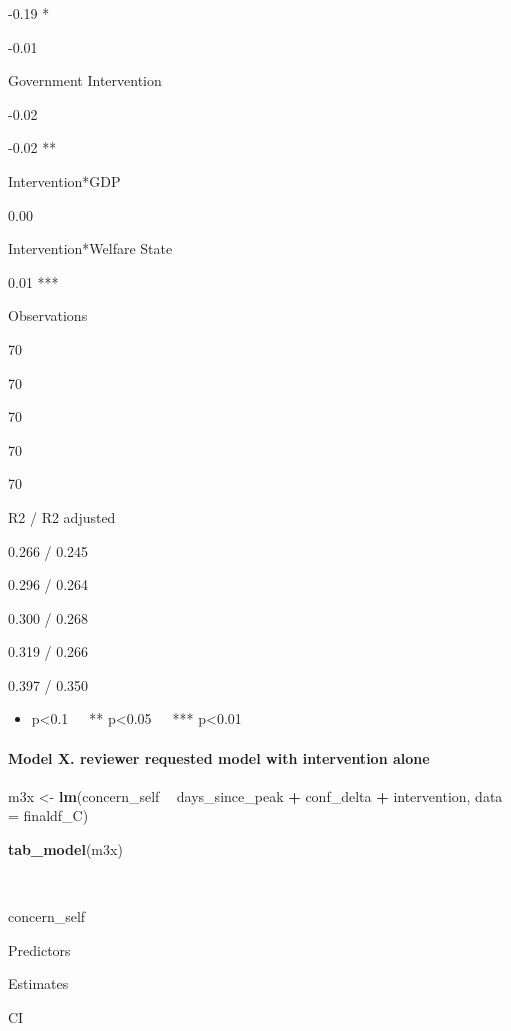 \documentclass[
]{article}
\newenvironment{Shaded}{\begin{snugshade}}{\end{snugshade}}
\newcommand{\DataTypeTok}[1]{\textcolor[rgb]{0.13,0.29,0.53}{#1}}
\newcommand{\KeywordTok}[1]{\textcolor[rgb]{0.13,0.29,0.53}{\textbf{#1}}}
\newcommand{\NormalTok}[1]{#1}
\newcommand{\OperatorTok}[1]{\textcolor[rgb]{0.81,0.36,0.00}{\textbf{#1}}}
\newcommand{\StringTok}[1]{\textcolor[rgb]{0.31,0.60,0.02}{#1}}
\providecommand{\tightlist}{%
  \setlength{\itemsep}{0pt}\setlength{\parskip}{0pt}}
\begin{document}
-0.19 *

-0.01

Government Intervention

-0.02

-0.02 **

Intervention*GDP

0.00

Intervention*Welfare State

0.01 ***

Observations

70

70

70

70

70

R2 / R2 adjusted

0.266 / 0.245

0.296 / 0.264

0.300 / 0.268

0.319 / 0.266

0.397 / 0.350

\begin{itemize}
\tightlist
\item
  p\textless0.1~~~** p\textless0.05~~~*** p\textless0.01
\end{itemize}

\hypertarget{model-x.-reviewer-requested-model-with-intervention-alone}{%
\paragraph{Model X. reviewer requested model with intervention
alone}\label{model-x.-reviewer-requested-model-with-intervention-alone}}

\begin{Shaded}
\begin{Highlighting}[]
\NormalTok{m3x <-}\StringTok{ }\KeywordTok{lm}\NormalTok{(concern_self }\OperatorTok{~}\StringTok{ }\NormalTok{days_since_peak }\OperatorTok{+}\StringTok{ }\NormalTok{conf_delta }\OperatorTok{+}\StringTok{ }\NormalTok{intervention, }\DataTypeTok{data =}\NormalTok{ finaldf_C)}

\KeywordTok{tab_model}\NormalTok{(m3x)}
\end{Highlighting}
\end{Shaded}

~

concern\_self

Predictors

Estimates

CI
\end{document}
